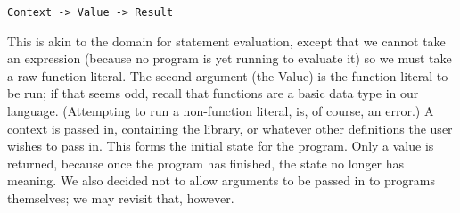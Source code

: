 \documentclass{article}
\begin{document}
\begin{lstlisting}
Context -> Value -> Result
\end{lstlisting}

This is akin to the domain for statement evaluation, except that we cannot take an expression (because no program is yet running to evaluate it) so we must take a raw function literal. The second argument (the Value) is the function literal to be run; if that seems odd, recall that functions are a basic data type in our language. (Attempting to run a non-function literal, is, of course, an error.)  A context is passed in, containing the library, or whatever other definitions the user wishes to pass in.  This forms the initial state for the program. Only a value is returned, because once the program has finished, the state no longer has meaning.  We also decided not to allow arguments to be passed in to programs themselves; we may revisit that, however.
\end{document}
